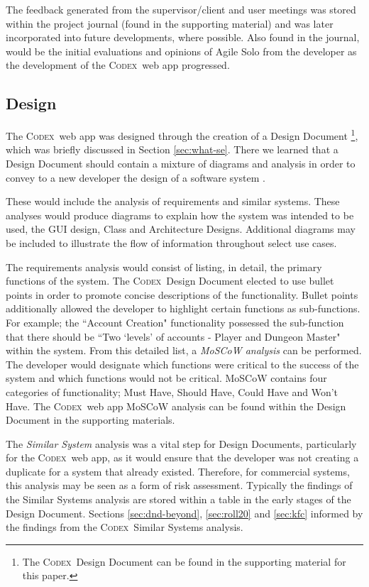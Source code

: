 \documentclass[final]{cmpreport}
\newcommand{\Codex}{\textsc{Codex}}
\begin{document}
		The feedback generated from the supervisor/client and user meetings was stored within the project journal (found in the supporting material) and was later incorporated into future developments, where possible. Also found in the journal, would be the initial evaluations and opinions of Agile Solo from the developer as the development of the \Codex \ web app progressed. 
		
		\subsection{Design} \label{sec:design}
		The \Codex \ web app was designed through the creation of a Design Document \footnote{The \Codex \ Design Document can be found in the supporting material for this paper.}, which was briefly discussed in Section \ref{sec:what-se}. There we learned that a Design Document should contain a mixture of diagrams and analysis in order to convey to a new developer the design of a software system \citep{DesignDocExample}.
		
		These would include the analysis of requirements and similar systems. These analyses would produce diagrams to explain how the system was intended to be used, the GUI design, Class and Architecture Designs. Additional diagrams may be included to illustrate the flow of information throughout select use cases.
		
		The requirements analysis would consist of listing, in detail, the primary functions of the system. The \Codex \ Design Document elected to use bullet points in order to promote concise descriptions of the functionality. Bullet points additionally allowed the developer to highlight certain functions as sub-functions. For example; the ``Account Creation" functionality possessed the sub-function that there should be ``Two `levels' of accounts - Player and Dungeon Master" within the system. From this detailed list, a \emph{MoSCoW analysis} can be performed. The developer would designate which functions were critical to the success of the system and which functions would not be critical. MoSCoW contains four categories of functionality; Must Have, Should Have, Could Have and Won't Have. The \Codex \ web app MoSCoW analysis can be found within the Design Document in the supporting materials.
		
		The \emph{Similar System} analysis was a vital step for Design Documents, particularly for the \Codex \ web app, as it would ensure that the developer was not creating a duplicate for a system that already existed. Therefore, for commercial systems, this analysis may be seen as a form of risk assessment. Typically the findings of the Similar Systems analysis are stored within a table in the early stages of the Design Document. Sections \ref{sec:dnd-beyond}, \ref{sec:roll20} and \ref{sec:kfc} informed by the findings from the \Codex \ Similar Systems analysis. 
		
\end{document}
